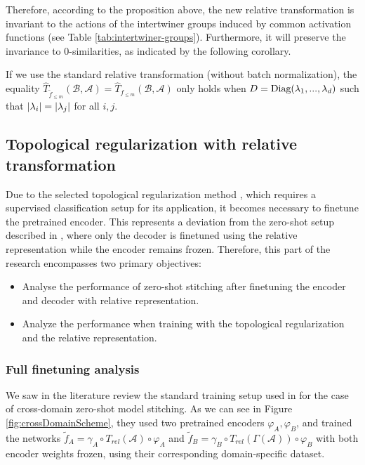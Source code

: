 \documentclass[../main.tex]{subfiles}
\begin{document}
Therefore, according to the proposition above, the new relative transformation is invariant to the actions of the intertwiner groups induced by common activation functions (see Table \ref{tab:intertwiner-groups}). Furthermore, it will preserve the invariance to $0$-similarities, as indicated by the following corollary.

\begin{corollary}
If we use the standard relative transformation (without batch normalization), the equality $\hat{T}_{\tilde{f}_{\leq m}}(\mathcal{B}, \mathcal{A}) = \hat{T}_{f_{\leq m}}(\mathcal{B}, \mathcal{A})$ only holds when $D=\text{\rm Diag}(\lambda_1,..., \lambda_d)$ such that $\left\lvert \lambda_i \right\rvert=\left\lvert \lambda_j \right\rvert$ for all $i, j$.
\end{corollary}

\subsection{Topological regularization with relative transformation}

Due to the selected topological regularization method \cite{hofer_densified_2021}, which requires a supervised classification setup for its application, it becomes necessary to finetune the pretrained encoder. This represents a deviation from the zero-shot setup described in \cite{moschella_relative_2022}, where only the decoder is finetuned using the relative representation while the encoder remains frozen. Therefore, this part of the research encompasses two primary objectives:

\begin{itemize}
    \item Analyse the performance of zero-shot stitching after finetuning the encoder and decoder with relative representation.
    
    \item Analyze the performance when training with the topological regularization and the relative representation. 
\end{itemize}

\subsubsection*{Full finetuning analysis}

We saw in the literature review the standard training setup used in \cite{moschella_relative_2022} for the case of cross-domain zero-shot model stitching. As we can see in Figure \ref{fig:crossDomainScheme}, they used two pretrained encoders $\varphi_A, \varphi_B$, and trained the networks $\tilde{f}_{A}=\gamma_A \circ T_{rel}(\mathcal{A})  \circ \varphi_A$ and $\tilde{f}_{B}=\gamma_B \circ T_{rel}(\Gamma(\mathcal{A}))  \circ \varphi_B$ with both encoder weights frozen, using their corresponding domain-specific dataset.
\end{document}
